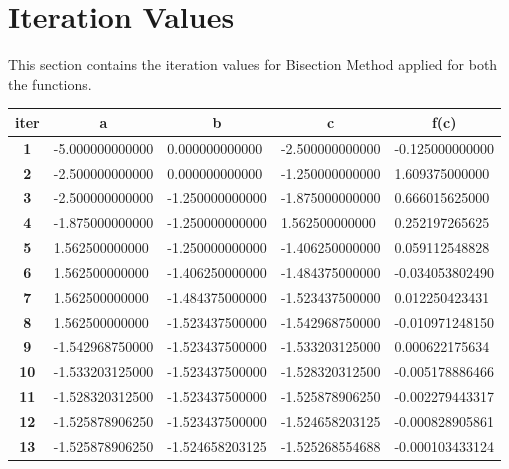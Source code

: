 \documentclass[a4paper, 12pt]{report}
\begin{document}
\section{Iteration Values}
This section contains the iteration values for Bisection Method applied for both the functions.\\
\begin{table}[!h]
\begin{tabular}{|l|l|l|l|l|}
\hline
\multicolumn{1}{|c|}{\textbf{iter}} &
  \multicolumn{1}{c|}{\textbf{a}} &
  \multicolumn{1}{c|}{\textbf{b}} &
  \multicolumn{1}{c|}{\textbf{c}} &
  \multicolumn{1}{c|}{\textbf{f(c)}} \\ \hline
\multicolumn{1}{|c|}{\textbf{1}}  & -5.000000000000 & 0.000000000000  & -2.500000000000 & -0.125000000000 \\ \hline
\multicolumn{1}{|c|}{\textbf{2}}  & -2.500000000000 & 0.000000000000  & -1.250000000000 & 1.609375000000  \\ \hline
\multicolumn{1}{|c|}{\textbf{3}}  & -2.500000000000 & -1.250000000000 & -1.875000000000 & 0.666015625000  \\ \hline
\multicolumn{1}{|c|}{\textbf{4}}  & -1.875000000000 & -1.250000000000 & 1.562500000000  & 0.252197265625  \\ \hline
\multicolumn{1}{|c|}{\textbf{5}}  & 1.562500000000  & -1.250000000000 & -1.406250000000 & 0.059112548828  \\ \hline
\multicolumn{1}{|c|}{\textbf{6}}  & 1.562500000000  & -1.406250000000 & -1.484375000000 & -0.034053802490 \\ \hline
\multicolumn{1}{|c|}{\textbf{7}}  & 1.562500000000  & -1.484375000000 & -1.523437500000 & 0.012250423431  \\ \hline
\multicolumn{1}{|c|}{\textbf{8}}  & 1.562500000000  & -1.523437500000 & -1.542968750000 & -0.010971248150 \\ \hline
\multicolumn{1}{|c|}{\textbf{9}}  & -1.542968750000 & -1.523437500000 & -1.533203125000 & 0.000622175634  \\ \hline
\multicolumn{1}{|c|}{\textbf{10}} & -1.533203125000 & -1.523437500000 & -1.528320312500 & -0.005178886466 \\ \hline
\multicolumn{1}{|c|}{\textbf{11}} & -1.528320312500 & -1.523437500000 & -1.525878906250 & -0.002279443317 \\ \hline
\multicolumn{1}{|c|}{\textbf{12}} & -1.525878906250 & -1.523437500000 & -1.524658203125 & -0.000828905861 \\ \hline
\multicolumn{1}{|c|}{\textbf{13}} & -1.525878906250 & -1.524658203125 & -1.525268554688 & -0.000103433124 \\ \hline

\end{tabular}
\end{table}
\end{document}
